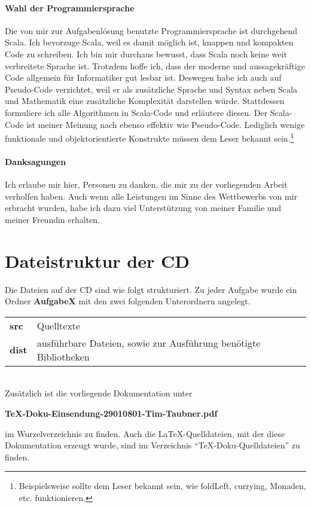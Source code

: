 \documentclass[a4paper,10pt,notitlepage]{scrreprt}
\begin{document}
\paragraph{Wahl der Programmiersprache}
 Die von mir zur Aufgabenlösung benutzte Programmiersprache ist durchgehend Scala.
 Ich bevorzuge Scala, weil es damit möglich ist, knappen und kompakten Code zu schreiben.
 Ich bin mir durchaus bewusst, dass Scala noch keine weit verbreitete Sprache ist.
 Trotzdem hoffe ich, dass der moderne und aussagekräftige Code allgemein für Informatiker gut lesbar ist.
 Deswegen habe ich auch auf Pseudo-Code verzichtet,
  weil er als zusätzliche Sprache und Syntax neben Scala und Mathematik eine zusätzliche Komplexität darstellen würde.
 Stattdessen formuliere ich alle Algorithmen in Scala-Code und erläutere diesen.
 Der Scala-Code ist meiner Meinung nach ebenso effektiv wie Pseudo-Code.
 Lediglich wenige funktionale und objektorientierte Konstrukte müssen dem Leser bekannt sein.\footnote{Beispielsweise
  sollte dem Leser bekannt sein, wie foldLeft, currying, Monaden, etc. funktionieren.}
\paragraph{Danksagungen}
 Ich erlaube mir hier, Personen zu danken, die mir zu der vorliegenden Arbeit verholfen haben.
 Auch wenn alle Leistungen im Sinne des Wettbewerbs von mir erbracht wurden,
  habe ich dazu viel Unterstützung von meiner Familie und meiner Freundin erhalten.
\section{Dateistruktur der CD}
 Die Dateien auf der CD sind wie folgt strukturiert.
 Zu jeder Aufgabe wurde ein Ordner \textbf{AufgabeX} mit den zwei folgenden Unterordnern angelegt.\\

 \begin{tabular}{ll}
  \textbf{src}  & Quelltexte \\
  \textbf{dist} & ausführbare Dateien, sowie zur Ausführung benötigte Bibliotheken \\
 \end{tabular}\\ \newline
 Zusätzlich ist die vorliegende Dokumentation unter
 \begin{center}\textbf{TeX-Doku-Einsendung-29010801-Tim-Taubner.pdf}\end{center}
 im Wurzelverzeichnis zu finden.
 Auch die \LaTeX-Quelldateien, mit der diese Dokumentation erzeugt wurde, sind im Verzeichnis ``TeX-Doku-Quelldateien'' zu finden.
\end{document}
